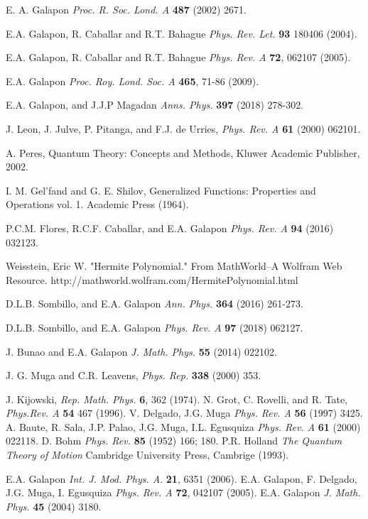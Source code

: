 \documentclass[%
 reprint,
 amsmath,amssymb,
 aps,
]{revtex4-1}
\begin{document}
\begin{thebibliography}{99}
E. A. Galapon {\em Proc. R. Soc. Lond. A} {\bf 487} (2002) 2671.

 E.A. Galapon, R. Caballar and R.T. Bahague {\it Phys. Rev. Let.} {\bf 93} 180406 (2004). 

E.A. Galapon, R. Caballar and R.T. Bahague {\it Phys. Rev. A} {\bf 72}, 062107 (2005).

 E.A. Galapon {\it Proc. Roy. Lond. Soc. A} {\bf 465}, 71-86 (2009).

 E.A. Galapon, and J.J.P Magadan {\it Anns. Phys.} {\bf 397} (2018) 278-302.

 J. Leon, J. Julve, P. Pitanga, and F.J. de Urries, {\it Phys. Rev. A} {\bf 61} (2000) 062101.

 A. Peres, Quantum Theory: Concepts and Methods, Kluwer Academic Publisher, 2002.

 I. M. Gel’fand and G. E. Shilov, Generalized  Functions: Properties  and  Operations vol. 1. Academic Press (1964).

 P.C.M. Flores, R.C.F. Caballar, and E.A. Galapon {\it Phys. Rev. A} {\bf 94} (2016) 032123.

 Weisstein, Eric W. "Hermite Polynomial." From MathWorld--A Wolfram Web Resource. http://mathworld.wolfram.com/HermitePolynomial.html 

 D.L.B. Sombillo, and E.A. Galapon {\it Ann. Phys.} {\bf 364} (2016) 261-273.

 D.L.B. Sombillo, and E.A. Galapon {\it Phys. Rev. A} {\bf 97} (2018) 062127.

 J. Bunao and E.A. Galapon {\it J. Math. Phys.} {\bf 55} (2014) 022102.

 J. G. Muga  and C.R. Leavens, {\em  Phys. Rep.} {\bf 338} (2000) 353. 
 
 J. Kijowski, {\it Rep. Math. Phys.} {\bf 6}, 362 (1974). 
 N. Grot, C. Rovelli, and R. Tate, {\it Phys.Rev. A} {\bf 54} 467 (1996). 
 V. Delgado, J.G. Muga {\it Phys. Rev. A} {\bf 56} (1997) 3425. 
 A. Baute, R. Sala, J.P. Palao, J.G. Muga, I.L. Egusquiza {\it Phys. Rev. A} {\bf 61} (2000) 022118. 
D. Bohm {\it Phys. Rev.} {\bf 85} (1952) 166; 180. P.R. Holland {\it The Quantum Theory of Motion} Cambridge University Press, Cambrige (1993).

 E.A. Galapon {\em Int. J. Mod. Phys. A}. {\bf 21}, 6351 (2006).
 E.A. Galapon, F. Delgado, J.G. Muga, I. Egusquiza {\it Phys. Rev. A} {\bf 72}, 042107 (2005).
 E.A. Galapon {\em J. Math. Phys.} {\bf 45} (2004) 3180.


\end{thebibliography}
\end{document}
